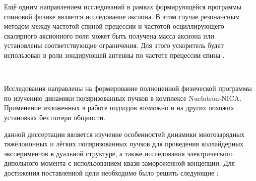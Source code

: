 \par Ещё одним направлением исследований в рамках формирующейся программы спиновой физике является исследование аксиона. В этом случае резонансным методом между частотой спиной прецессии и частотой осциллирующего скалярного аксионного поля может быть получена масса аксиона или установлены соответствующие ограничения. Для этого ускоритель будет использован в роли зондирующей антенны по частоте прецессии спина \cite{Axion_Nikolaev}.

~\\
\par {\actuality} Исследования направлены на формирование полноценной физической программы по изучению динамики поляризованных пучков в комплексе Nuclotron-NICA. Применение изложенных в работе подходов возможно и на других похожих установках без потери общности.
~\\
\par {\aim} данной диссертации является изучение особенностей динамики многозарядных тяжёлоионных и лёгких поляризованных пучков для проведения коллайдерных экспериментов в дуальной структуре, а также исследования электрического дипольного момента с использованием квази-замороженной концепции.
Для достижения поставленной цели необходимо было 
решить следующие {\tasks}:

